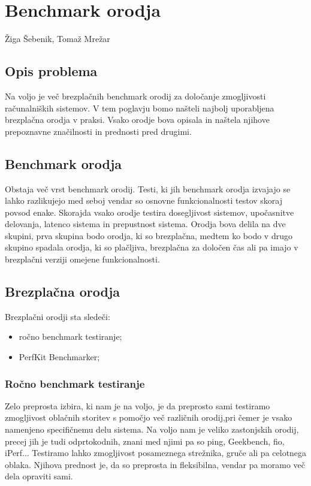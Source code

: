 \chapter[Benchmark orodja]{Benchmark orodja}

\pagestyle{fancy}
\fancyhf{}
\fancyhead[LE,RO]{\thepage}
\fancyhead[RE,LO]{\leftmark}

\huge Žiga Šebenik, Tomaž Mrežar
\normalsize
\bigskip

\section{Opis problema}
Na voljo je več brezplačnih benchmark orodij za določanje zmogljivosti računalniških sistemov. V tem poglavju bomo našteli najbolj uporabljena brezplačna orodja v praksi.
Vsako orodje bova opisala in naštela njihove prepoznavne značilnosti in prednosti pred drugimi.
  


\section{Benchmark orodja}
Obstaja več vrst benchmark orodij. Testi, ki jih benchmark orodja izvajajo se lahko razlikujejo med seboj vendar so osnovne funkcionalnosti testov skoraj povsod enake. Skorajda vsako orodje testira dosegljivost sistemov, upočasnitve delovanja, latenco sistema in prepustnost sistema. Orodja bova delila na dve skupini, prva skupina bodo orodja, ki so brezplačna, medtem ko bodo v drugo skupino spadala orodja, ki so plačljiva, brezplačna za določen čas ali pa imajo v brezplačni verziji omejene funkcionalnosti.

\section{Brezplačna orodja}
Brezplačni orodji sta sledeči:
\begin{itemize}
\item ročno benchmark testiranje;
\item PerfKit Benchmarker;
\end{itemize}

\subsection{Ročno benchmark testiranje}
Zelo preprosta izbira, ki nam je na voljo, je da preprosto sami testiramo zmogljivost oblačnih storitev s pomočjo več različnih orodij,pri čemer je vsako namenjeno specifičnemu delu sistema. Na voljo nam je veliko zastonjskih orodij, precej jih je tudi odprtokodnih, znani med njimi pa so ping, Geekbench, fio, iPerf... Testiramo lahko zmogljivost posameznega strežnika, gruče ali pa celotnega oblaka. Njihova prednost je, da so preprosta in fleksibilna, vendar pa moramo več dela opraviti sami.

